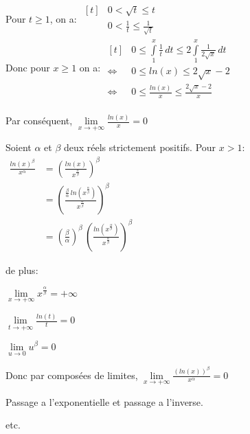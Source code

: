 \documentclass[12pt,twoside,a4paper]{article}
\begin{document}
		\begin{preuve}
			\begin{liste}
				\item Pour $t\geq1$, on a: $\begin{aligned}[t]&0<\sqrt{t}\leq t\\&0<\frac{1}{t}\leq\frac{1}{\sqrt{t}}\end{aligned}$\\
						Donc pour $x\geq1$ on a: $\begin{aligned}[t]&0\leq\int\limits_1^x\frac{1}{t}\,dt\leq2\int\limits_1^x\frac{1}{2\sqrt{x}}\,dt\\
						\iff&0\leq ln(x)\leq2\sqrt{x}-2\\
						\iff&0\leq\frac{ln(x)}{x}\leq\frac{2\sqrt{x}-2}{x}\end{aligned}$\\\\
						Par cons\'equent, $\lim\limits_{x\rightarrow+\infty}\frac{ln(x)}{x}=0$
				\item Soient $\alpha$ et $\beta$ deux r\'eels strictement positifs. Pour $x>1$:\\
						$\begin{aligned}
							\frac{ln(x)^\beta}{x^\alpha}&=\left(\frac{ln(x)}{x^\frac{\alpha}{\beta}}\right)^\beta\\
							&=\left(\frac{\frac{\beta}{\alpha}\,ln\left(x^\frac{\alpha}{\beta}\right)}{x^\frac{\alpha}{\beta}}\right)^\beta\\
							&=\left(\frac{\beta}{\alpha}\right)^\beta\,\left(\frac{ln\left(x^\frac{\alpha}{\beta}\right)}{x^\frac{\alpha}{\beta}}\right)^\beta
						\end{aligned}$
						\begin{tab}
							de plus:
							\begin{liste}
								\item $\lim\limits_{x\rightarrow+\infty}x^\frac{\alpha}{\beta}=+\infty$
								\item $\lim\limits_{t\rightarrow+\infty}\frac{ln(t)}{t}=0$
								\item $\lim\limits_{u\rightarrow0}u^\beta=0$
							\end{liste}
							Donc par compos\'ees de limites, $\lim\limits_{x\rightarrow+\infty}\frac{\left(ln(x)\right)^\beta}{x^\alpha}=0$
						\end{tab}
				\item Passage a l'exponentielle et passage a l'inverse.
				\item etc.
			\end{liste}
		\end{preuve}
\end{document}
